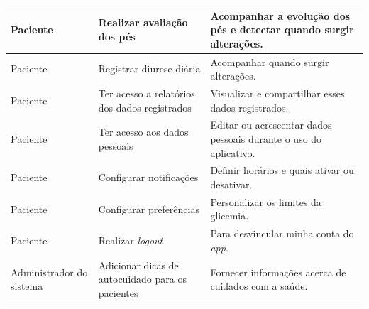 \begin{table}[htb]
\begin{center}
\begin{tabular}{p{2.0cm}|p{5.0cm}|p{7.0cm}}
            \hline
            Paciente                                                       &
            Realizar avaliação dos pés                                     &
            Acompanhar a evolução dos pés e detectar quando surgir alterações.                                                  \\
            \hline
            Paciente                                                       &
            Registrar diurese diária                                       &
            Acompanhar quando surgir alterações.                                                                                \\
            \hline
            Paciente                                                       &
            Ter acesso a relatórios dos dados registrados                  &
            Visualizar e compartilhar esses dados registrados.                                                                  \\
            \hline
            Paciente                                                       &
            Ter acesso aos dados pessoais                                  &
            Editar ou acrescentar dados pessoais durante o uso do aplicativo.                                                   \\
            \hline
            Paciente                                                       &
            Configurar notificações                                        &
            Definir horários e quais ativar ou desativar.                                                                       \\
            \hline
            Paciente                                                       &
            Configurar preferências                                        &
            Personalizar os limites da glicemia.                                                                                \\
            \hline
            Paciente                                                       &
            Realizar \emph{logout}                                         &
            Para desvincular minha conta do \emph{app}.                                                                         \\
            \hline
            Administrador do sistema                                       &
            Adicionar dicas de autocuidado para os pacientes               &
            Fornecer informações acerca de cuidados com a saúde.                                                                \\

\end{tabular}
\end{center}
\end{table}
